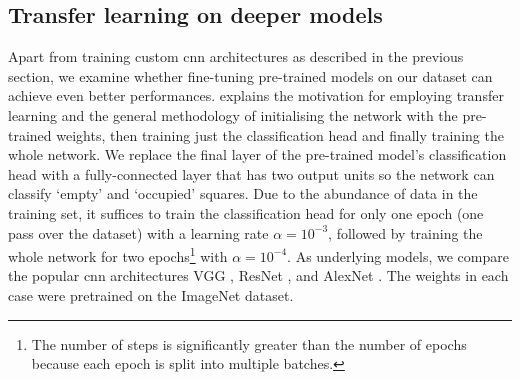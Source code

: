 \documentclass[../main.tex]{subfiles}
\begin{document}
\subsection{Transfer learning on deeper models}
\label{sec:occupancy_transfer_learning}
Apart from training custom \gls{cnn} architectures as described in the previous section, we examine whether fine-tuning pre-trained models on our dataset can achieve even better performances.
 explains the motivation for employing transfer learning and the general methodology of initialising the network with the pre-trained weights, then training just the classification head and finally training the whole network.
We replace the final layer of the pre-trained model's classification head with a fully-connected layer that has two output units so the network can classify `empty' and `occupied' squares.
Due to the abundance of data in the training set, it suffices to train the classification head for only one epoch (one pass over the dataset) with a learning rate $\alpha=10^{-3}$, followed by training the whole network for two epochs\footnote{The number of steps is significantly greater than the number of epochs because each epoch is split into multiple batches.} with $\alpha=10^{-4}$.
As underlying models, we compare the popular \gls{cnn} architectures
VGG \cite{simonyan2015},
ResNet \cite{he2016}, and
AlexNet \cite{krizhevsky2017}.
The weights in each case were pretrained on the ImageNet \cite{deng2009} dataset.
\end{document}
